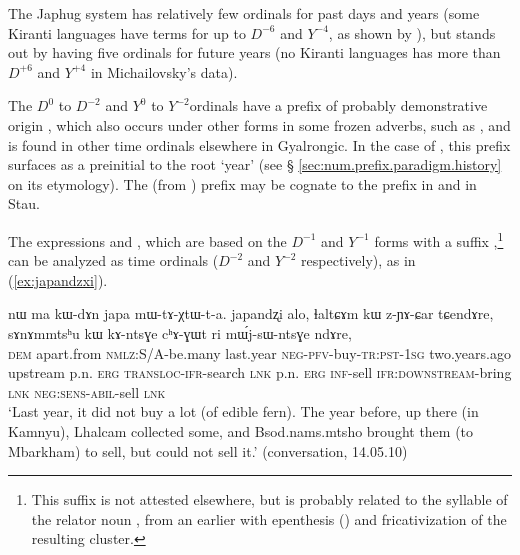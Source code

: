 The Japhug system has relatively few ordinals for past days and years (some Kiranti languages have terms for up to $D^{-6}$ and $Y^{-4}$, as shown by \citealt{michailovsky03ordinals}), but stands out by having five ordinals for future years (no Kiranti languages has more than $D^{+6}$ and $Y^{+4}$ in Michailovsky's \citeyear{michailovsky03ordinals} data). 

The $D^{0}$ to $D^{-2}$ and $Y^{0}$ to $Y^{-2}$ordinals have a prefix of probably demonstrative origin , which also occurs under other forms in some frozen adverbs, such as , and is found in other time ordinals elsewhere in Gyalrongic. In the case of , this prefix surfaces as a preinitial   to the root  `year' (see § \ref{sec:num.prefix.paradigm.history} on its etymology). The  (from ) prefix may be cognate to the prefix  in  and  in Stau.

 The expressions   and , which are based on the $D^{-1}$ and $Y^{-1}$ forms with a suffix ,\footnote{This suffix  is not attested elsewhere, but is probably related to the syllable  of the relator noun , from an earlier  with epenthesis () and fricativization of the resulting  cluster. } can be analyzed as time ordinals ($D^{-2}$ and $Y^{-2}$ respectively), as in (\ref{ex:japandzxi}).
 
 \begin{exe}
\ex \label{ex:japandzxi}
 \gll   nɯ ma kɯ-dɤn japa mɯ-tɤ-χtɯ-t-a. japandʐi alo, ɬaltɕɤm kɯ z-ɲɤ-ɕar tɕendɤre, sɤnɤmmtsʰu kɯ kɤ-ntsɣe cʰɤ-ɣɯt ri mɯ́j-sɯ-ntsɣe ndɤre, \\
 \textsc{dem} apart.from \textsc{nmlz}:S/A-be.many last.year \textsc{neg}-\textsc{pfv}-buy-\textsc{tr}:\textsc{pst}-\textsc{1sg}  two.years.ago upstream p.n. \textsc{erg} \textsc{transloc}-\textsc{ifr}-search \textsc{lnk} p.n. \textsc{erg} \textsc{inf}-sell \textsc{ifr}:\textsc{downstream}-bring \textsc{lnk} \textsc{neg}:\textsc{sens}-\textsc{abil}-sell \textsc{lnk} \\
\glt `Last year, it did not buy a lot (of edible fern). The year before, up there (in Kamnyu), Lhalcam collected some, and Bsod.nams.mtsho brought them (to Mbarkham) to sell, but could not sell it.' (conversation, 14.05.10)
 \end{exe}

